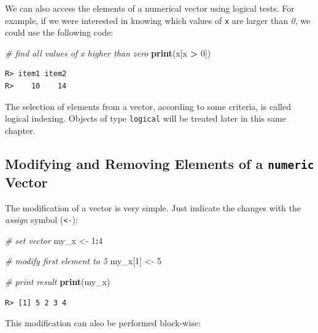 \documentclass[
  12pt,
]{book}
\newenvironment{Shaded}{\begin{snugshade}}{\end{snugshade}}
\newcommand{\CommentTok}[1]{\textcolor[rgb]{0.37,0.37,0.37}{\textit{#1}}}
\newcommand{\DecValTok}[1]{\textcolor[rgb]{0.06,0.06,0.06}{#1}}
\newcommand{\KeywordTok}[1]{\textcolor[rgb]{0.27,0.27,0.27}{\textbf{#1}}}
\newcommand{\NormalTok}[1]{#1}
\newcommand{\OperatorTok}[1]{\textcolor[rgb]{0.43,0.43,0.43}{\textbf{#1}}}
\newcommand{\StringTok}[1]{\textcolor[rgb]{0.5,0.5,0.5}{#1}}
\begin{document}
We can also access the elements of a numerical vector using logical tests. For example, if we were interested in knowing which values of \texttt{x} are larger than \emph{0}, we could use the following code:

\begin{Shaded}
\begin{Highlighting}[]
\CommentTok{# find all values of x higher than zero}
\KeywordTok{print}\NormalTok{(x[x }\OperatorTok{>}\StringTok{ }\DecValTok{0}\NormalTok{])}
\end{Highlighting}
\end{Shaded}

\begin{verbatim}
R> item1 item2 
R>    10    14
\end{verbatim}

The selection of elements from a vector, according to some criteria, is called logical indexing. Objects of type \texttt{logical} will be treated later in this same chapter.

\hypertarget{modifying-and-removing-elements-of-a-numeric-vector}{%
\subsection{\texorpdfstring{Modifying and Removing Elements of a \texttt{numeric} Vector}{Modifying and Removing Elements of a numeric Vector}}\label{modifying-and-removing-elements-of-a-numeric-vector}}

The modification of a vector is very simple. Just indicate the changes with the \emph{assign} symbol (\texttt{\textless{}-}): 

\begin{Shaded}
\begin{Highlighting}[]
\CommentTok{# set vector}
\NormalTok{my_x <-}\StringTok{ }\DecValTok{1}\OperatorTok{:}\DecValTok{4}

\CommentTok{# modify first element to 5}
\NormalTok{my_x[}\DecValTok{1}\NormalTok{] <-}\StringTok{ }\DecValTok{5}

\CommentTok{# print result}
\KeywordTok{print}\NormalTok{(my_x)}
\end{Highlighting}
\end{Shaded}

\begin{verbatim}
R> [1] 5 2 3 4
\end{verbatim}

This modification can also be performed block-wise:
\end{document}
